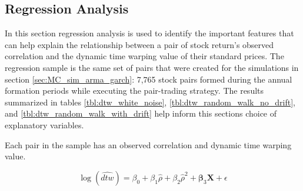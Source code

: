 \documentclass[12pt]{article}
\begin{document}
\subsection{Regression Analysis}

In this section regression analysis is used to identify the important features that can help explain the relationship between a pair of stock return's observed correlation and the dynamic time warping value of their standard prices. The regression sample is the same set of pairs that were created for the simulations in section \ref{sec:MC_sim_arma_garch}: 7,765 stock pairs formed during the annual formation periods while executing the pair-trading strategy. The results summarized in tables \ref{tbl:dtw_white_noise}, \ref{tbl:dtw_random_walk_no_drift}, and \ref{tbl:dtw_random_walk_with_drift} help inform this sections choice of explanatory variables.

Each pair in the sample has an observed correlation and dynamic time warping value.

\begin{equation}
    \log(\widehat{dtw}) = \beta_{0} + \beta_{1} \hat{\rho} + \beta_{2} \hat{\rho}^{2} + \boldsymbol{\beta}_{3} \boldsymbol{X} + \epsilon
\end{equation}
\end{document}
